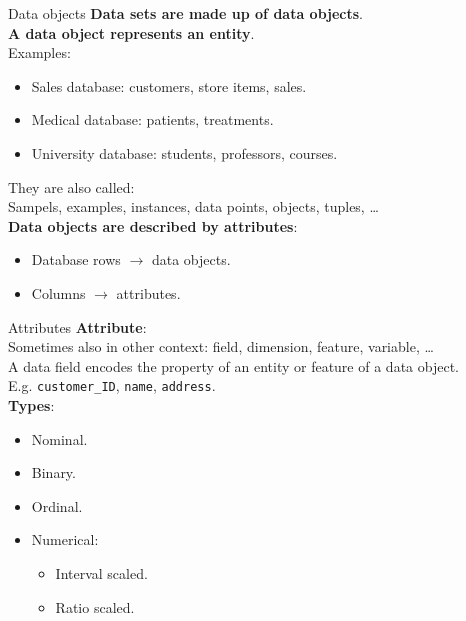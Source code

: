 \documentclass[aspectratio=169,t]{beamer}
\begin{document}
  { 
    \begin{frame}{Data objects}
      \textbf{Data sets are made up of data objects}.\\
      \textbf{A data object represents an entity}.\\[0.2cm]

      Examples:
      \begin{itemize}
          \item Sales database: customers, store items, sales.
          \item Medical database: patients, treatments.
          \item University database: students, professors, courses.
      \end{itemize}

      They are also called:\\
      Sampels, examples, instances, data points, objects, tuples, \ldots\\[0.2cm]

      \textbf{Data objects are described by attributes}:
      \begin{itemize}
          \item Database rows $\rightarrow$ data objects.
          \item Columns $\rightarrow$ attributes.
      \end{itemize}
    \end{frame}
  }

  { 
    \begin{frame}{Attributes}
    \textbf{Attribute}:\\
    Sometimes also in other context: field, dimension, feature, variable, \ldots\\[0.2cm]
    A data field encodes the property of an entity or feature of a data object.\\
    E.g. \texttt{customer\_ID}, \texttt{name}, \texttt{address}.\\[0.5cm]

    \textbf{Types}:
    \begin{itemize}
      \item Nominal.
      \item Binary.
      \item Ordinal.
      \item Numerical:
      \begin{itemize}
        \item Interval scaled.
        \item Ratio scaled.
      \end{itemize}
    \end{itemize}
    \end{frame}
  }
\end{document}
